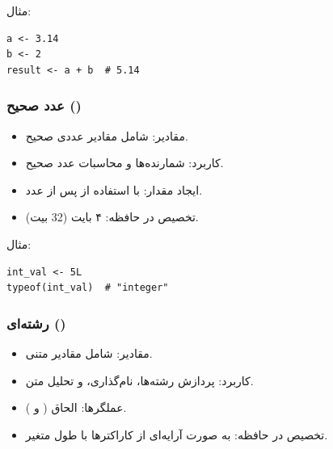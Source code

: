 \documentclass[11pt, a4paper, oneside]{book}
\begin{document}
					مثال:

					\begin{latin}
						\begin{lstlisting}[caption={\lr{Numeric data type}}] 
a <- 3.14
b <- 2
result <- a + b  # 5.14

						\end{lstlisting}
					\end{latin}
				
				\subsubsection{عدد صحیح ()}
				
					\begin{itemize}
						
						\item {\large مقادیر}:
						{\normalsize  شامل مقادیر عددی صحیح.}
						
						\item {\large کاربرد}:
						{\normalsize شمارنده‌ها و محاسبات عدد صحیح.}
						
						\item {\large ایجاد مقدار}:
						{\normalsize با استفاده از  پس از عدد.}
						
						\item {\large تخصیص در حافظه}:
						{\normalsize ۴ بایت (32 بیت).}
						
					\end{itemize}
					
					مثال:
					
					\begin{latin}
						\begin{lstlisting}[caption={\lr{Integer data type}}] 
int_val <- 5L
typeof(int_val)  # "integer"

						\end{lstlisting}
					\end{latin}
				
				\subsubsection{رشته‌ای ()}
					
					\begin{itemize}
						
						\item {\large مقادیر}:
						{\normalsize  شامل مقادیر متنی.}
						
						\item {\large کاربرد}:
						{\normalsize پردازش رشته‌ها، نام‌گذاری، و تحلیل متن.}
						
						\item {\large عملگرها}:
						{\normalsize الحاق ( و ).}
						
						\item {\large تخصیص در حافظه}:
						{\normalsize به صورت آرایه‌ای از کاراکترها با طول متغیر.}
						
					\end{itemize}
					
\end{document}
